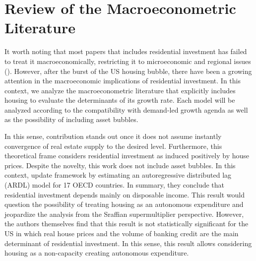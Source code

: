 \section{Review of the Macroeconometric Literature}\label{sec:empirical_review}


It worth noting that most papers that includes residential investment has failed to treat it macroeconomically, restricting it to microeconomic and regional issues (\cite{arestis_u.s._2008}).
However, after the burst of the US housing bubble, there have been a growing attention in the macroeconomic implications of residential investment.
In this context, we analyze the macroeconometric literature that explicitly includes housing to evaluate the determinants of its growth rate.
Each model will be analyzed according to the compatibility with demand-led growth agenda as well as the possibility of including asset bubbles.

In this sense, \textcite{poterba_tax_1984} contribution stands out once it does not assume instantly convergence of real estate supply to the desired level.
Furthermore, this theoretical frame considers residential investment as induced positively by house prices.
Despite the novelty, this work does not include asset bubbles.
In this context,  \textcite{arestis_residential_2015} update \textcite{poterba_tax_1984} framework by estimating an autoregressive distributed lag (ARDL) model for 17 OECD countries.
In summary, they conclude that residential investment depends mainly on disposable income.
This result would  question the possibility of treating housing as an autonomous expenditure and jeopardize the analysis from the Sraffian supermultiplier perspective.
However, the authors themselves find that this result is not statistically significant for the US in which real house prices and the volume of banking credit are the main determinant of residential investment.
In this sense, this result allows considering housing as a non-capacity creating autonomous expenditure.

